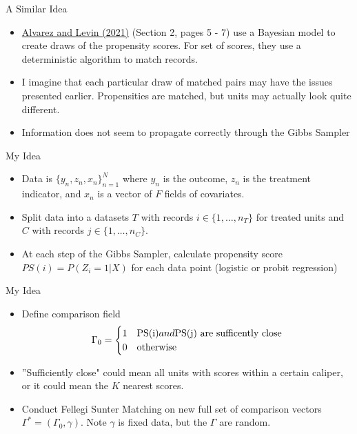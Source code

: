 \documentclass{beamer}
\begin{document}
\begin{frame}{A Similar Idea}
	\begin{itemize}
		\item\href{https://arxiv.org/pdf/2105.02362.pdf}{Alvarez and Levin (2021)} (Section 2, pages 5 - 7) use a Bayesian model to create draws of the propensity scores. For set of scores, they use a deterministic algorithm to match records. 
		\item I imagine that each particular draw of matched pairs may have the issues presented earlier. Propensities are matched, but units may actually look quite different.
		\item Information does not seem to propagate correctly through the Gibbs Sampler
	\end{itemize}
\end{frame}

\begin{frame}{My Idea}
	\begin{itemize}
		\item Data is $\{y_n, z_n, x_n\}_{n = 1}^N$ where $y_n$ is the outcome, $z_n$ is the treatment indicator, and $x_n$ is a vector of $F$ fields of covariates. 
		\item Split data into a datasets $T$ with records $i \in \{1, \ldots, n_T\}$ for treated units and $C$ with records $j \in \{1, \ldots, n_C\}$. 
		\item At each step of the Gibbs Sampler, calculate propensity score $PS(i) = P(Z_i = 1 | X)$ for each data point (logistic or probit regression)
	\end{itemize}
\end{frame}

\begin{frame}{My Idea}
	\begin{itemize}
		\item Define comparison field 
		\begin{align}
			\Gamma_{0} = \begin{cases}
				1 & $PS(i)$ and $PS(j)$ \text{ are sufficently close} \\
				0 & \text{otherwise} \\
			\end{cases}
		\end{align} 
		\item ''Sufficiently close" could mean all units with scores within a certain caliper, or it could mean the $K$ nearest scores.
		\item Conduct Fellegi Sunter Matching on new full set of comparison vectors $\Gamma^{*} = (\Gamma_0, \gamma)$.
		Note $\gamma$ is fixed data, but the $\Gamma$ are random. 
	\end{itemize}
\end{frame}
\end{document}
